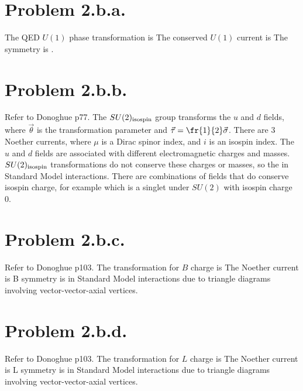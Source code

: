 \documentclass{article}
\begin{document}
\section*{Problem 2.b.a.}
The QED $U(1)$ phase transformation is
The conserved $U(1)$ current is
The symmetry is . 
\section*{Problem 2.b.b.}
Refer to Donoghue p77. The $SU(2)_{\textrm{isospin}}$ group transforms the $u$ and $d$ fields,
where $\vec{\theta}$ is the transformation parameter and $\vec{\tau}=\fr{1}{2}\vec{\sigma}$. There are 3 Noether currents, 
where $\mu$ is a Dirac spinor index, and $i$ is an isospin index.
The $u$ and $d$ fields are associated with different electromagnetic charges and masses. $SU(2)_{\textrm{isospin}}$ transformations do not conserve these charges or masses, so the  in Standard Model interactions. There are combinations of fields that do conserve isospin charge, for example
which is a singlet under $SU(2)$ with isospin charge 0.
\section*{Problem 2.b.c.}
Refer to Donoghue p103. The transformation for $B$ charge is
The Noether current is
B symmetry is  in Standard Model interactions due to triangle diagrams involving vector-vector-axial vertices.
\section*{Problem 2.b.d.}
Refer to Donoghue p103. The transformation for $L$ charge is
The Noether current is
L symmetry is  in Standard Model interactions due to triangle diagrams involving vector-vector-axial vertices.
\end{document}
